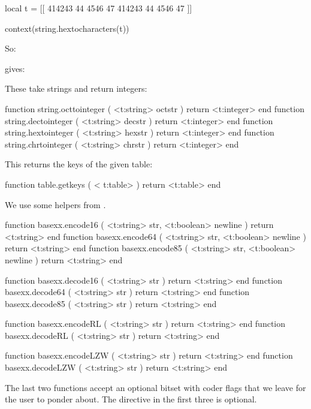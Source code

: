 \startbuffer
\startluacode
local t = [[
  414243 44 4546 47
  414243 44 4546 47
]]

context(string.hextocharacters(t))
\stopluacode
\stopbuffer

So:

\typebuffer

gives: \inlinebuffer

These take strings and return integers:

\starttyping[option=LUA]
function string.octtointeger ( <t:string> octstr ) return <t:integer> end
function string.dectointeger ( <t:string> decstr ) return <t:integer> end
function string.hextointeger ( <t:string> hexstr ) return <t:integer> end
function string.chrtointeger ( <t:string> chrstr ) return <t:integer> end
\stoptyping

\stopsubsection

\startsubsection[title=Extra table helpers]

This returns the keys of the given table:

\starttyping[option=LUA]
function table.getkeys ( < t:table> )
    return <t:table>
end
\stoptyping

\stopsubsection

\startsubsection[title=Byte encoding and decoding]

We use some helpers from .

\starttyping[option=LUA]
function basexx.encode16  ( <t:string> str, <t:boolean> newline )
    return <t:string>
end
function basexx.encode64  ( <t:string> str, <t:boolean> newline )
    return <t:string>
end
function basexx.encode85  ( <t:string> str, <t:boolean> newline )
    return <t:string>
end

function basexx.decode16  ( <t:string> str ) return <t:string> end
function basexx.decode64  ( <t:string> str ) return <t:string> end
function basexx.decode85  ( <t:string> str ) return <t:string> end

function basexx.encodeRL  ( <t:string> str ) return <t:string> end
function basexx.decodeRL  ( <t:string> str ) return <t:string> end

function basexx.encodeLZW ( <t:string> str ) return <t:string> end
function basexx.decodeLZW ( <t:string> str ) return <t:string> end
\stoptyping

The last two functions accept an optional bitset with coder flags that we leave
for the user to ponder about. The  directive in the first three is
optional.

\stopsubsection

